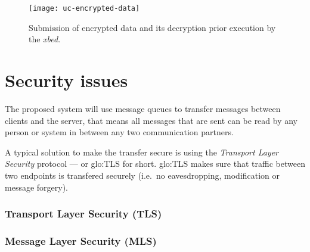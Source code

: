 \begin{figure}[h!]
  \begin{center}
    \texttt{[image: uc-encrypted-data]}
  \end{center}
  \caption[UC  Encrypted  Data]{Submission   of  encrypted  data  and  its
    decryption prior execution by the \emph{xbed}.}
  \label{fig:uc-terminate-task}
\end{figure}

\section{Security issues}
\label{sec:security-requirements}

The proposed system  will use message queues to  transfer messages between
clients and the server, that means  all messages that are sent can be read
by any person or system in between any two communication partners. 

A   typical  solution   to  make   the  transfer   secure  is   using  the
\emph{Transport Layer  Security} protocol --- or  \gls{glo:TLS} for short.
\gls{glo:TLS} makes sure that  traffic between two endpoints is transfered
securely (i.e.~no eavesdropping, modification or message forgery).

\subsubsection{Transport Layer Security (TLS)}


\subsubsection{Message Layer Security (MLS)}


